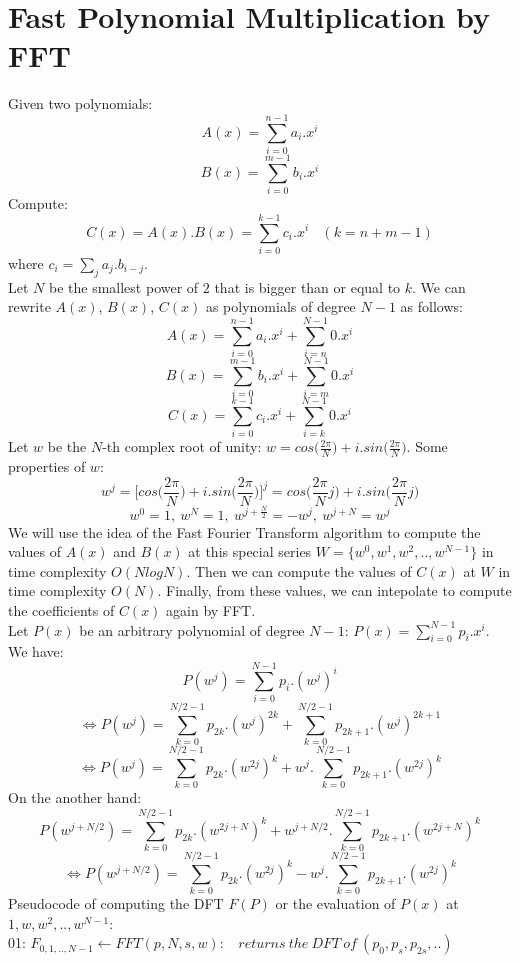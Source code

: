 \documentclass{article}
\begin{document}
\section{Fast Polynomial Multiplication by FFT}
Given two polynomials:
$$A(x) = \sum\limits_{i = 0}^{n - 1} a_i.x^i$$
$$B(x) = \sum\limits_{i = 0}^{m - 1} b_i.x^i$$
Compute:
$$C(x) = A(x).B(x) = \sum\limits_{i = 0}^{k - 1} c_i.x^i \ \ \ \ (k = n + m - 1)$$
where $c_i = \sum\limits_{j} a_j.b_{i - j}$. \\
Let $N$ be the smallest power of $2$ that is bigger than or equal to $k$. We can rewrite $A(x)$, $B(x)$, $C(x)$ as polynomials of degree $N - 1$ as follows:
$$A(x) = \sum\limits_{i = 0}^{n - 1} a_i.x^i + \sum\limits_{i = n}^{N - 1} 0.x^i$$
$$B(x) = \sum\limits_{i = 0}^{m - 1} b_i.x^i + \sum\limits_{i = m}^{N - 1} 0.x^i$$
$$C(x) = \sum\limits_{i = 0}^{k - 1} c_i.x^i + \sum\limits_{i = k}^{N - 1} 0.x^i$$
Let $w$ be the $N$-th complex root of unity: $w = cos \big(\frac{2\pi}{N}\big) + i.sin \big(\frac{2\pi}{N}\big)$. Some properties of $w$:
$$w^j = \bigg[cos\bigg(\frac{2\pi}{N}\bigg) + i.sin\bigg(\frac{2\pi}{N}\bigg)\bigg]^j = cos\bigg(\frac{2\pi}{N}j\bigg) + i.sin\bigg(\frac{2\pi}{N}j\bigg)$$
$$w^0 = 1, \ w^N = 1,\ w^{j + \frac{N}{2}} = -w^j, \ w^{j + N} = w^j$$
We will use the idea of the Fast Fourier Transform algorithm to compute the values of $A(x)$ and $B(x)$ at this special series $W = \{w^0, w^1, w^2, .., w^{N - 1}\}$ in time complexity $O(NlogN)$. Then we can compute the values of $C(x)$ at $W$ in time complexity $O(N)$. Finally, from these values, we can intepolate to compute the coefficients of $C(x)$ again by FFT. \\
Let $P(x)$ be an arbitrary polynomial of degree $N - 1$: $P(x) = \sum\limits_{i = 0}^{N - 1} p_i.x^i$. We have:
$$P(w^j) = \sum\limits_{i = 0}^{N - 1} p_i.(w^j)^i$$
$$\Leftrightarrow P(w^j) = \sum\limits_{k = 0}^{N/2 - 1} p_{2k}.(w^j)^{2k} + \sum\limits_{k = 0}^{N/2 - 1} p_{2k + 1}.(w^j)^{2k + 1}$$
$$\Leftrightarrow P(w^j) = \sum\limits_{k = 0}^{N/2 - 1} p_{2k}.(w^{2j})^k + w^j.\sum\limits_{k = 0}^{N/2 - 1} p_{2k + 1}.(w^{2j})^k$$
On the another hand:
$$P(w^{j + N/2}) = \sum\limits_{k = 0}^{N/2 - 1} p_{2k}.(w^{2j + N})^k + w^{j + N/2}.\sum\limits_{k = 0}^{N/2 - 1} p_{2k + 1}.(w^{2j + N})^k$$
$$\Leftrightarrow P(w^{j + N/2}) = \sum\limits_{k = 0}^{N/2 - 1} p_{2k}.(w^{2j})^k - w^j.\sum\limits_{k = 0}^{N/2 - 1} p_{2k + 1}.(w^{2j})^k$$
Pseudocode of computing the DFT $F(P)$ or the evaluation of $P(x)$ at $1, w, w^2, .., w^{N - 1}$: \\
01: $F_{0, 1, .., N - 1} \leftarrow FFT(p, N, s, w): \ \ \ \ returns \ the \ DFT \ of \ (p_0, p_s, p_{2s}, ..) $ \\
\end{document}
